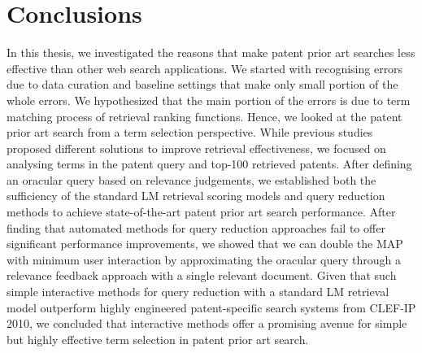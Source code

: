\chapter{Conclusions}
\label{cha:conc}


In this thesis, we investigated the reasons that make patent prior art searches 
less effective than other web search applications.
We started with recognising errors due to data curation and baseline settings that 
make only small portion of the whole errors. We hypothesized that the main portion of the errors is 
due to term matching process of retrieval ranking functions. 
Hence, we looked at the patent prior art search from
a term selection perspective. While previous studies proposed
different solutions to improve retrieval effectiveness, we 
focused on analysing terms in the patent query and top-100 retrieved patents. 
After defining an oracular query based on
relevance judgements, we established both the sufficiency
of the standard LM retrieval scoring models and query reduction 
methods to achieve state-of-the-art patent prior art
search performance. After finding that automated methods 
for query reduction approaches fail to offer significant
performance improvements, we showed that we can double
the MAP with minimum user interaction by approximating
the oracular query through a relevance feedback approach
with a single relevant document. Given that such simple 
interactive methods for query reduction with a standard LM
retrieval model outperform highly engineered patent-specific
search systems from CLEF-IP 2010, we concluded that interactive 
methods offer a promising avenue for simple but
highly effective term selection in patent prior art search.
 

